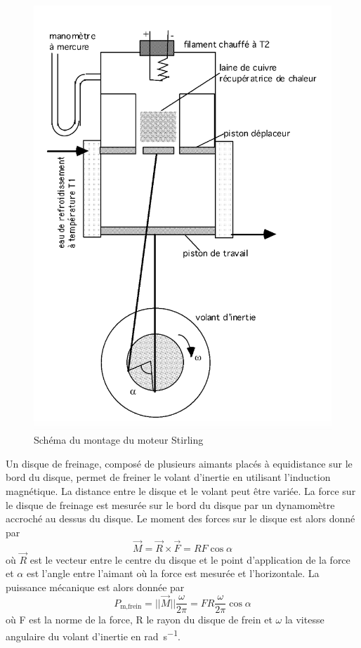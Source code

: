\begin{figure}
    \centering
    \includegraphics[width=\linewidth]{figures/montage.png}
    \caption{Schéma du montage du moteur Stirling \cite{notice}}
    \label{fig:montage}
    \vspace{1cm}
\end{figure}

Un disque de freinage, composé de plusieurs aimants placés à equidistance sur le bord du disque, permet de freiner le volant d'inertie en utilisant l'induction magnétique. La distance entre le disque et le volant peut être variée. La force sur le disque de freinage est mesurée sur le bord du disque par un dynamomètre accroché au dessus du disque. Le moment des forces sur le disque est alors donné par
\begin{equation}
    \vec{M} = \vec{R} \times \vec{F} = RF \cos{\alpha}
\end{equation}
où \(\vec{R}\) est le vecteur entre le centre du disque et le point d'application de la force et \(\alpha\) est l'angle entre l'aimant où la force est mesurée et l'horizontale. La puissance mécanique est alors donnée par
\begin{equation}
    P_\textrm{m,frein} = ||\vec{M}||\frac{\omega}{2 \pi} = F R \frac{\omega}{2 \pi} \cos{\alpha}
    \label{eq:pm_frein}
\end{equation}
où F est la norme de la force, R le rayon du disque de frein et \(\omega\) la vitesse angulaire du volant d'inertie en \si{\radian\per\second}.

